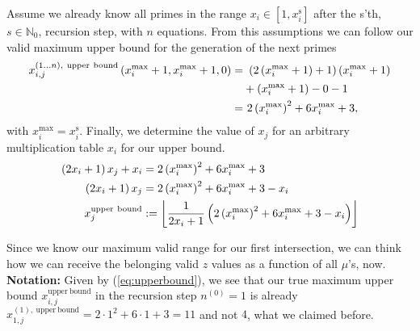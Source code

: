 \begin{enumerate}
	Assume we already know all primes in the range $x_{i} \in [1,x_{i}^{\mathrm{s}}]$ after the s'th, $s \in \mathbb{N}_{0}$, recursion step, with $n$ equations. From this assumptions we can follow our valid maximum upper bound for the generation of the next primes
	\begin{alignat}{3}
		x_{i,j}^{\left(1 \dots n\right), \ \mathrm{upper \ bound}}\left(x_{i}^{\mathrm{max}}+1,x_{i}^{\mathrm{max}} + 1,0\right) =& \ \left(2\left(x_{i}^{\mathrm{max}}+1\right) + 1\right)\left(x_{i}^{\mathrm{max}}+1\right) \notag \\
	&+ \left(x_{i}^{\mathrm{max}}+1\right) - 0 -1 \notag \\
	=& \ 2\left(x_{i}^{\mathrm{max}}\right)^{2} + 6x_{i}^{\mathrm{max}} + 3, \label{eq:upperbound}
	\end{alignat}
	with $x_{i}^{\mathrm{max}} = x_{i}^{\mathrm{s}}$. Finally, we determine the value of $x_{j}$ for an arbitrary multiplication table $x_{i}$ for our upper bound.
	\begin{alignat}{3}
		\left(2x_{i} + 1\right)x_{j} + x_{i} &= 2\left(x_{i}^{\mathrm{max}}\right)^{2} + 6x_{i}^{\mathrm{max}} + 3 \notag \\
		\left(2x_{i} + 1\right)x_{j} &= 2\left(x_{i}^{\mathrm{max}}\right)^{2} + 6x_{i}^{\mathrm{max}} + 3 - x_{i} \notag \\
		x_{j}^{\mathrm{upper \ bound}} &:= \left\lfloor \frac{1}{2x_{i} + 1}\left(2\left(x_{i}^{\mathrm{max}}\right)^{2} + 6x_{i}^{\mathrm{max}} + 3 - x_{i}\right) \right\rfloor \label{eq:xi_upperbound_2xi+1table}
	\end{alignat}	

\label{en:intbounds35_dis}
\end{enumerate}

Since we know our maximum valid range for our first intersection, we can think how we can receive the belonging valid $z$ values as a function of all $\mu$'s, now.\\

\textbf{Notation:} Given by (\ref{eq:upperbound}), we see that our true maximum upper bound $x_{i,j}^{\mathrm{upper \ bound}}$ in the recursion step $n^{\left(0\right)} = 1$ is already $x_{1,j}^{\left(1\right), \ \mathrm{upper \ bound}} = 2 \cdot 1^{2} + 6 \cdot 1 + 3 = 11$ and not $4$, what we claimed before.\\

